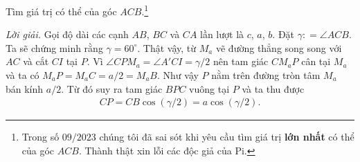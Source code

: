 \begin{multicols}{2}
	\vskip 0.1cm
	Tìm giá trị có thể của góc $ACB$.\footnote{\color{cackithi}Trong số $09/2023$ chúng tôi đã sai sót khi yêu cầu tìm giá trị \textbf{\color{cackithi}lớn nhất} có thể của góc $ACB$. Thành thật xin lỗi các độc giả của Pi.}	
		\begin{figure}[H]
			\vspace*{-10pt}
			\centering
			\captionsetup{labelformat= empty, justification=centering}
		\vspace*{-10pt}
		\end{figure}
		\textit{Lời giải.} Gọi độ dài các cạnh $AB$, $BC$ và $CA$ lần lượt là $c$, $a$, $b$. Đặt $\gamma \colon = \angle ACB$. Ta sẽ chứng minh rằng $\gamma = 60^{\circ}$.
		\vskip 0.1cm
		Thật vậy, từ $M_a$ vẽ đường thẳng song song với $AC$ và cắt $CI$ tại $P$. Vì $\angle CPM_a = \angle A'CI = \gamma/2$ nên tam giác $CM_aP$ cân tại $M_a$ và ta có $M_aP = M_aC = a/2 = M_aB$. Như vậy $P$ nằm trên đường tròn tâm $M_a$ bán kính $a/2$. Từ đó suy ra tam giác $BPC$ vuông tại $P$ và ta thu được 
		\begin{align*}
			CP = CB \cos (\gamma /2) = a \cos(\gamma/2).
		\end{align*}
		\begin{figure}[H]
			\vspace*{-5pt}
			\centering
			\resizebox{\columnwidth}{!}{\begin{tikzpicture}[color= cackithi]
				\tkzSetUpPoint[size=4, fill= teal!50]
				

\end{tikzpicture}}
\end{figure}
\end{multicols}
